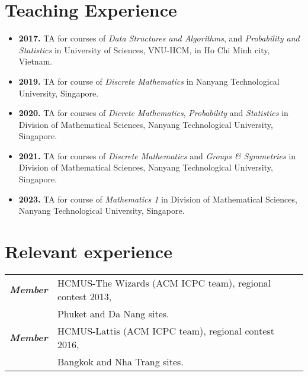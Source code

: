 \documentclass[a4paper, 11pt]{article}
\begin{document}
	\section{Teaching Experience}
	\begin{itemize}
		\item \textbf{2017.} TA for courses of \textit{Data Structures and Algorithms}, and \textit{Probability and Statistics} in University of Sciences, VNU-HCM, in Ho Chi Minh city, Vietnam.
		\item \textbf{2019.} TA for course of \textit{Discrete Mathematics} in Nanyang Technological University, Singapore.
		\item \textbf{2020.} TA for courses of \textit{Dicrete Mathematics}, \textit{Probability} and \textit{Statistics} in Division of Mathematical Sciences, Nanyang Technological University, Singapore.
		\item \textbf{2021.} TA for courses of \textit{Discrete Mathematics} and \textit{Groups \& Symmetries} in Division of Mathematical Sciences, Nanyang Technological University, Singapore.
		\item \textbf{2023.} TA for course of \textit{Mathematics 1} in Division of Mathematical Sciences, Nanyang Technological University, Singapore.
	\end{itemize}
	
	\section{Relevant experience}
	\begin{tabular}{rl}
		{\sl \textbf{Member}} & HCMUS-The Wizards (ACM ICPC team), regional contest 2013,\\
		& Phuket and Da Nang sites.\\
		{\sl \textbf{Member}} & HCMUS-Lattis (ACM ICPC team), regional contest 2016,\\
		& Bangkok and Nha Trang sites. 
	\end{tabular}
	
	
	
\end{document}
